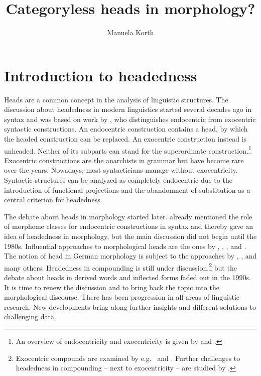 \documentclass[output=paper
  ,nobabel
  ,draftmode
  ,colorlinks, citecolor=brown
]{langscibook}
\title{Categoryless heads in morphology?}
\author{Manuela Korth\orcid{0000-0002-3750-6131}\affiliation{Universität Potsdam}}
\begin{document}
\maketitle

\section{Introduction to headedness}\label{sec-intro-kor}
Heads are a common concept in the analysis of linguistic structures. The discussion about headedness in modern linguistics started several decades ago in syntax and was based on work by \citet{Bloomfield1933}, who distinguishes endocentric from exocentric syntactic constructions. An endocentric construction contains a head, by which the headed construction can be replaced. An exocentric construction instead is unheaded. Neither of its subparts can stand for the superordinate construction.\footnote{An overview of endocentricity and exocentricity is given by \citet{Hincha1961} and \citet{Barri1975}.}  Exocentric constructions are the anarchists in grammar but have become rare over the years. Nowadays, most syntacticians manage without exocentricity. Syntactic structures can be analyzed as completely endocentric due to the introduction of functional projections and the abandonment of substitution as a central criterion for headedness.

The debate about heads in morphology started later. \citet{Harris1946} already mentioned the role of morpheme classes for endocentric constructions in syntax and thereby gave an idea of headedness in morphology, but the main discussion did not begin until the 1980s. Influential approaches to morphological heads are the ones by \citet{Williams1981}, \citet{Lieber1981, Lieber1992}, \citet{Selkirk1982}, and \citet{DiSciulloWilliams1987}. The notion of head in German morphology is subject to the approaches by \citet{Hoehle1982}, \citet{Reis1983}, \citet{Olsen1986, Olsen1990} and many others. Headedness in compounding is still under discussion,\footnote{Exocentric compounds are examined by e.g.\ \citet{Bauer2008} and \citet{ScaliseEtAl2009}. Further challenges to headedness in compounding – next to exocentricity – are studied by \citet{ScaliseFabregas2010}.} but the debate about heads in derived words and inflected forms faded out in the 1990s. It is time to renew the discussion and to bring back the topic into the morphological discourse. There has been progression in all areas of linguistic research. New developments bring along further insights and different solutions to challenging data. 
\end{document}
